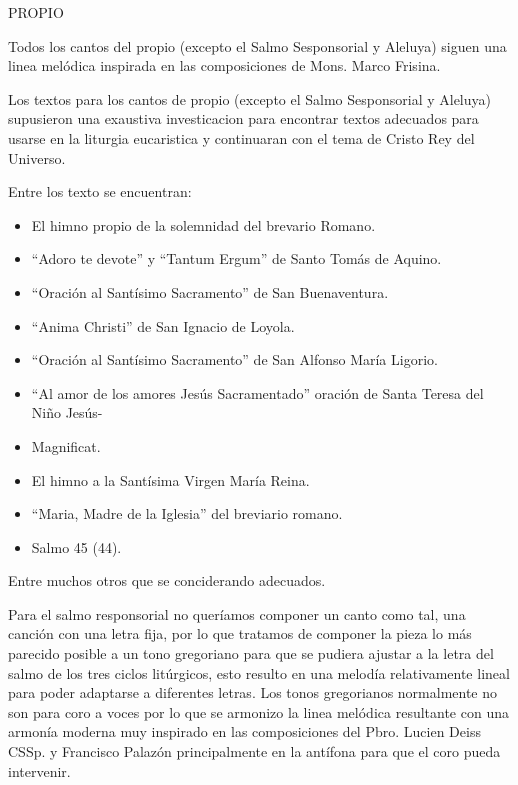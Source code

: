 \documentclass[12pt, letterpaper]{report}
\begin{document}
    \LARGE PROPIO

    \Large Todos los cantos del propio (excepto el Salmo Sesponsorial y Aleluya) siguen una linea mel\'odica inspirada en las composiciones de Mons. Marco Frisina.

    Los textos para los cantos de propio (excepto el Salmo Sesponsorial y Aleluya) supusieron una exaustiva investicacion para encontrar textos adecuados para usarse en la liturgia eucaristica y continuaran con el tema de Cristo Rey del Universo.

    Entre los texto se encuentran:

    \begin{itemize}
      \item El himno propio de la solemnidad del brevario Romano.
      \item ``Adoro te devote'' y ``Tantum Ergum'' de Santo Tom\'as de Aquino.
      \item ``Oraci\'on al Sant\'isimo Sacramento'' de San Buenaventura.
      \item ``Anima Christi'' de San Ignacio de Loyola.
      \item ``Oraci\'on al Sant\'isimo Sacramento'' de San Alfonso Mar\'ia Ligorio.
      \item ``Al amor de los amores Jes\'us Sacramentado'' oraci\'on de Santa Teresa del Ni\~no Jes\'us-
      \item Magnificat.
      \item El himno a la Sant\'isima Virgen Mar\'ia Reina.
      \item ``Maria, Madre de la Iglesia'' del breviario romano.
      \item Salmo 45 (44).
    \end{itemize}

    Entre muchos otros que se conciderando adecuados.

    Para el salmo responsorial no quer\'iamos componer un canto como tal, una canci\'on con una letra fija, por lo que tratamos de componer la pieza lo m\'as parecido posible a un tono gregoriano para que se pudiera ajustar a la letra del salmo de
    los tres ciclos lit\'urgicos, esto resulto en una melod\'ia relativamente lineal para poder adaptarse a diferentes letras. Los tonos gregorianos normalmente no son para coro a voces por lo que se armonizo la linea mel\'odica resultante con una armon\'ia moderna muy inspirado en las composiciones del Pbro. Lucien Deiss CSSp. y Francisco Palaz\'on principalmente en la ant\'ifona para que el coro pueda intervenir.
\end{document}
